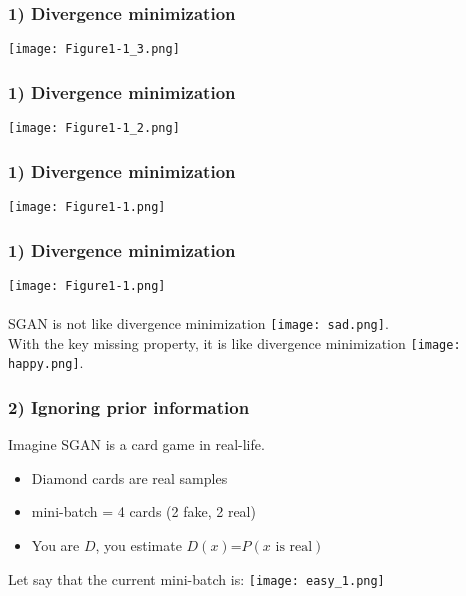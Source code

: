 \documentclass[t]{beamer}
\begin{document}

\begin{frame}
	\frametitle{1) Divergence minimization}
	\texttt{[image: Figure1-1\_3.png]}
\end{frame}




\begin{frame}
	\frametitle{1) Divergence minimization}
	\texttt{[image: Figure1-1\_2.png]}
\end{frame}




\begin{frame}
	\frametitle{1) Divergence minimization}
	\texttt{[image: Figure1-1.png]}
\end{frame}



\begin{frame}
	\frametitle{1) Divergence minimization}
	\texttt{[image: Figure1-1.png]} \\~\\ 
	SGAN is not like divergence minimization \texttt{[image: sad.png]}. \\
	With the key missing property, it is like divergence minimization \texttt{[image: happy.png]}.
\end{frame}



\begin{frame}
	\frametitle{2) Ignoring prior information}
	
	Imagine SGAN is a card game in real-life. 
	\begin{itemize}
		\item Diamond cards are real samples
		\item mini-batch = 4 cards (2 fake, 2 real)
		\item You are $D$, you estimate $D(x)$=$P(x \text{ is real})$
	\end{itemize} \vspace{.10cm}
	Let say that the current mini-batch is:
	\centering
	\texttt{[image: easy\_1.png]}
\end{frame}
\end{document}
